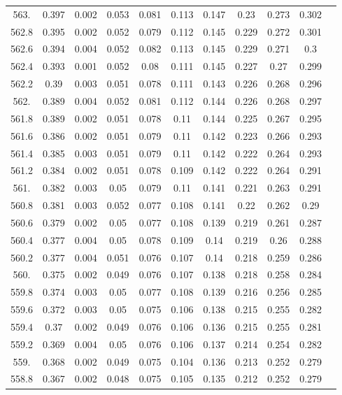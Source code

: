\documentclass[12pt]{ctexart}
\numberwithin{equation}{section}
\begin{document}
\begin{longtable}{ccccccccccc}
563.	&	0.397	&	0.002	&	0.053	&	0.081	&	0.113	&	0.147	&	0.23	&	0.273	&	0.302	\\
562.8	&	0.395	&	0.002	&	0.052	&	0.079	&	0.112	&	0.145	&	0.229	&	0.272	&	0.301	\\
562.6	&	0.394	&	0.004	&	0.052	&	0.082	&	0.113	&	0.145	&	0.229	&	0.271	&	0.3	\\
562.4	&	0.393	&	0.001	&	0.052	&	0.08	&	0.111	&	0.145	&	0.227	&	0.27	&	0.299	\\
562.2	&	0.39	&	0.003	&	0.051	&	0.078	&	0.111	&	0.143	&	0.226	&	0.268	&	0.296	\\
562.	&	0.389	&	0.004	&	0.052	&	0.081	&	0.112	&	0.144	&	0.226	&	0.268	&	0.297	\\
561.8	&	0.389	&	0.002	&	0.051	&	0.078	&	0.11	&	0.144	&	0.225	&	0.267	&	0.295	\\
561.6	&	0.386	&	0.002	&	0.051	&	0.079	&	0.11	&	0.142	&	0.223	&	0.266	&	0.293	\\
561.4	&	0.385	&	0.003	&	0.051	&	0.079	&	0.11	&	0.142	&	0.222	&	0.264	&	0.293	\\
561.2	&	0.384	&	0.002	&	0.051	&	0.078	&	0.109	&	0.142	&	0.222	&	0.264	&	0.291	\\
561.	&	0.382	&	0.003	&	0.05	&	0.079	&	0.11	&	0.141	&	0.221	&	0.263	&	0.291	\\
560.8	&	0.381	&	0.003	&	0.052	&	0.077	&	0.108	&	0.141	&	0.22	&	0.262	&	0.29	\\
560.6	&	0.379	&	0.002	&	0.05	&	0.077	&	0.108	&	0.139	&	0.219	&	0.261	&	0.287	\\
560.4	&	0.377	&	0.004	&	0.05	&	0.078	&	0.109	&	0.14	&	0.219	&	0.26	&	0.288	\\
560.2	&	0.377	&	0.004	&	0.051	&	0.076	&	0.107	&	0.14	&	0.218	&	0.259	&	0.286	\\
560.	&	0.375	&	0.002	&	0.049	&	0.076	&	0.107	&	0.138	&	0.218	&	0.258	&	0.284	\\
559.8	&	0.374	&	0.003	&	0.05	&	0.077	&	0.108	&	0.139	&	0.216	&	0.256	&	0.285	\\
559.6	&	0.372	&	0.003	&	0.05	&	0.075	&	0.106	&	0.138	&	0.215	&	0.255	&	0.282	\\
559.4	&	0.37	&	0.002	&	0.049	&	0.076	&	0.106	&	0.136	&	0.215	&	0.255	&	0.281	\\
559.2	&	0.369	&	0.004	&	0.05	&	0.076	&	0.106	&	0.137	&	0.214	&	0.254	&	0.282	\\
559.	&	0.368	&	0.002	&	0.049	&	0.075	&	0.104	&	0.136	&	0.213	&	0.252	&	0.279	\\
558.8	&	0.367	&	0.002	&	0.048	&	0.075	&	0.105	&	0.135	&	0.212	&	0.252	&	0.279	\\

\end{longtable}
\end{document}

